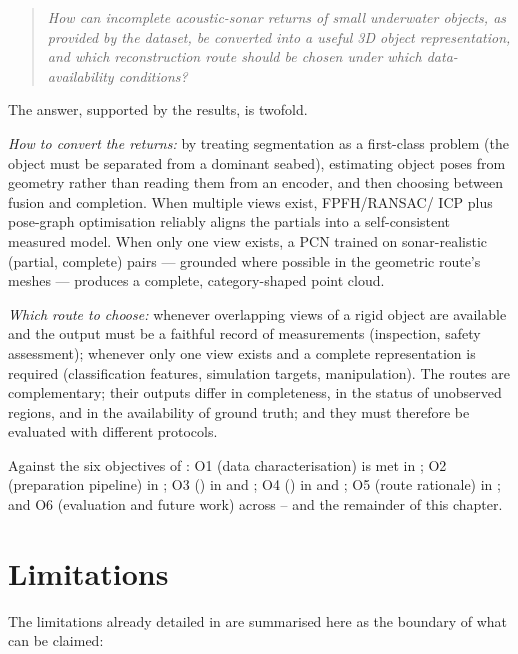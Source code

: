 \begin{quote}
\emph{How can incomplete acoustic-sonar returns of small underwater objects,
as provided by the \suop{} dataset, be converted into a useful 3D object
representation, and which reconstruction route should be chosen under which
data-availability conditions?}
\end{quote}

The answer, supported by the results, is twofold.

\emph{How to convert the returns:} by treating segmentation as a first-class
problem (the object must be separated from a dominant seabed), estimating
object poses from geometry rather than reading them from an encoder, and then
choosing between fusion and completion. When multiple views exist, FPFH/RANSAC/
ICP plus pose-graph optimisation reliably aligns the partials into a
self-consistent measured model. When only one view exists, a PCN trained on
sonar-realistic (partial, complete) pairs --- grounded where possible in the
geometric route's meshes --- produces a complete, category-shaped point cloud.

\emph{Which route to choose:} \routeA{} whenever overlapping views of a rigid
object are available and the output must be a faithful record of measurements
(inspection, safety assessment); \routeB{} whenever only one view exists and a
complete representation is required (classification features, simulation
targets, manipulation). The routes are complementary; their outputs differ in
completeness, in the status of unobserved regions, and in the availability of
ground truth; and they must therefore be evaluated with different protocols.

Against the six objectives of : O1 (data
characterisation) is met in ; O2 (preparation pipeline) in
; O3 (\routeA{}) in  and
; O4 (\routeB{}) in  and
; O5 (route rationale) in ; and O6
(evaluation and future work) across --
and the remainder of this chapter.

\section{Limitations}
\label{sec:conc_limitations}

The limitations already detailed in  are summarised here
as the boundary of what can be claimed:

